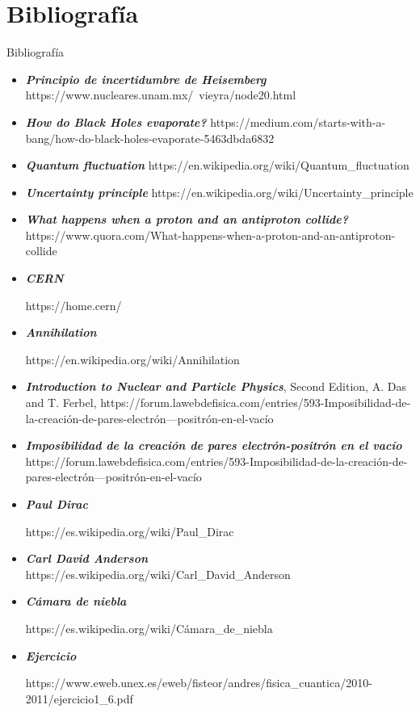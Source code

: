 \documentclass{beamer}
\begin{document}
\section{Bibliografía}
\begin{frame}{Bibliografía}
\begin{itemize}
    \item \textit{\textbf{Principio de incertidumbre de Heisemberg}} https://www.nucleares.unam.mx/~vieyra/node20.html
    \item \textit{\textbf{How do Black Holes evaporate?}} https://medium.com/starts-with-a-bang/how-do-black-holes-evaporate-5463dbda6832
    \item \textit{\textbf{Quantum fluctuation}} https://en.wikipedia.org/wiki/Quantum\_fluctuation
    \item \textit{\textbf{Uncertainty principle}} https://en.wikipedia.org/wiki/Uncertainty\_principle
    \item \textit{\textbf{What happens when a proton and an antiproton collide?}} https://www.quora.com/What-happens-when-a-proton-and-an-antiproton-collide
    \item \textit{\textbf{CERN}} 
    \par https://home.cern/
    \item \textit{\textbf{Annihilation}} 
    \par https://en.wikipedia.org/wiki/Annihilation
\end{itemize}
\end{frame}
\begin{frame}{}
    \begin{itemize}
        \item \textit{\textbf{Introduction to Nuclear and Particle Physics}}, Second Edition, A. Das and T. Ferbel, https://forum.lawebdefisica.com/entries/593-Imposibilidad-de-la-creación-de-pares-electrón---positrón-en-el-vacío
        \item \textit{\textbf{Imposibilidad de la creación de pares electrón-positrón en el vacío}} https://forum.lawebdefisica.com/entries/593-Imposibilidad-de-la-creación-de-pares-electrón---positrón-en-el-vacío 
        \item \textit{\textbf{Paul Dirac}} \par  https://es.wikipedia.org/wiki/Paul\_Dirac
        \item \textit{\textbf{Carl David Anderson}} https://es.wikipedia.org/wiki/Carl\_David\_Anderson
        \item \textit{\textbf{Cámara de niebla}} \par
        https://es.wikipedia.org/wiki/Cámara\_de\_niebla
        \item \textit{\textbf{Ejercicio}} \par
        https://www.eweb.unex.es/eweb/fisteor/andres/fisica\_cuantica/2010-2011/ejercicio1\_6.pdf
    \end{itemize}
\end{frame}
\end{document}
